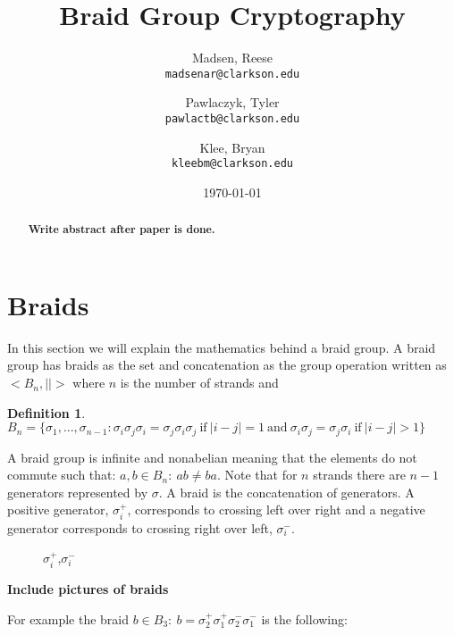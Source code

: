 \documentclass{article}
\title{Braid Group Cryptography}
\author{
  Madsen, Reese\\
  \texttt{madsenar@clarkson.edu}
  \and
  Pawlaczyk, Tyler\\
  \texttt{pawlactb@clarkson.edu}
   \and
  Klee, Bryan\\
  \texttt{kleebm@clarkson.edu}
}
\date{\today}
\theoremstyle{definition}
\newtheorem{definition}{Definition}[section]
\begin{document}
	\maketitle

	\begin{abstract}
	\textbf{Write abstract after paper is done.}
	\end{abstract}
	\newpage
	\section{Braids}
	In this section we will explain the mathematics behind a braid group. A braid group has braids as the set and concatenation as the group operation written as $<B_n,||>$ where $n$ is the number of strands and 

\begin{definition} 
$B_n=\{\sigma_1,...,\sigma_{n-1}:\sigma_i\sigma_j\sigma_i=\sigma_j\sigma_i\sigma_j\ \textrm{if}\ |i-j|=1\ \textrm{and}\ \sigma_i\sigma_j=\sigma_j\sigma_i\ \textrm{if}\ |i-j|>1\}$
\end{definition}
 
A braid group is infinite and nonabelian meaning that the elements do not commute such that:
$a,b \in B_n: \ ab\neq ba$. Note that for $n$ strands there are $n-1$ generators represented by $\sigma$. A braid is the concatenation of generators. A positive generator, $\sigma_i^+$, corresponds to crossing left over right and a negative generator corresponds to crossing right over left, $\sigma_i^-$. 

\begin{figure}[hbp!]
\centering
  \caption{$\sigma_i^+$,$\sigma_i^-$}\label{fig:graph}
\end{figure}

\textbf{Include pictures of braids}


For example the braid $b \in B_3: \ b=\sigma_2^+ \sigma_1^+ \sigma_2^- \sigma_1^-$ is the following:
	
	\begin{figure}[hbp!]
\centering
\end{figure}
	
	
\end{document}
